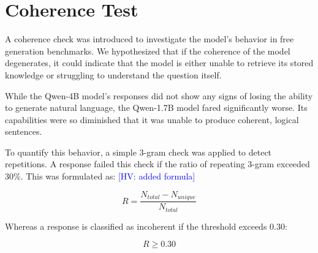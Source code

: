 \documentclass{article}
\newcommand{\hv}[1]{\textcolor{blue}{{[HV: #1]}}}
\begin{document}
\FloatBarrier


\section{Coherence Test}
\label{sec:coher}
A coherence check was introduced to investigate the model's behavior in free generation benchmarks. We hypothesized that if the coherence of the model degenerates, it could indicate that the model is either unable to retrieve its stored knowledge or struggling to understand the question itself.

While the Qwen-4B model's responses did not show any signs of losing the ability to generate natural language, the Qwen-1.7B model fared significantly worse. Its capabilities were so diminished that it was unable to produce coherent, logical sentences. 

To quantify this behavior, a simple 3-gram check was applied to detect repetitions.
A response failed this check if the ratio of repeating 3-gram exceeded 30\%.
This was formulated as: \hv{added formula}

\begin{equation}
\label{eq:repetition_ratio}
    R = \frac{N_{total} - N_{unique}}{N_{total}}
\end{equation}

Whereas a response is classified as incoherent if the threshold exceeds $0.30$:

\begin{equation}
R \ge{0.30}
\end{equation}
\end{document}
